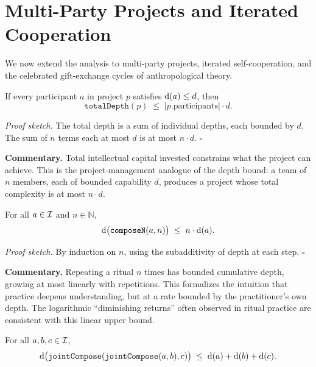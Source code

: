 \section{Multi-Party Projects and Iterated Cooperation}
\label{sec:ch16-multi}

We now extend the analysis to multi-party projects, iterated
self-cooperation, and the celebrated gift-exchange cycles of
anthropological theory.

\begin{theorem}
\label{thm:project_depth_bound}
If every participant $a$ in project $p$ satisfies $\operatorname{d}(a) \leq d$, then
\[
  \texttt{totalDepth}(p) \;\leq\; |p.\text{participants}| \cdot d.
\]
\end{theorem}

\noindent\textit{Proof sketch.}\quad
The total depth is a sum of individual depths, each bounded by $d$.
The sum of $n$ terms each at most $d$ is at most $n \cdot d$.
\hfill$\square$

\medskip

\noindent\textbf{Commentary.}
Total intellectual capital invested constrains what the project can achieve.
This is the project-management analogue of the depth bound: a team of $n$
members, each of bounded capability $d$, produces a project whose total
complexity is at most $n \cdot d$.

\begin{theorem}
\label{thm:iterated_self_cooperation_depth}
For all $a \in \mathcal{I}$ and $n \in \mathbb{N}$,
\[
  \operatorname{d}\bigl(\texttt{composeN}(a, n)\bigr) \;\leq\; n \cdot \operatorname{d}(a).
\]
\end{theorem}

\noindent\textit{Proof sketch.}\quad
By induction on $n$, using the subadditivity of depth at each step.
\hfill$\square$

\medskip

\noindent\textbf{Commentary.}
Repeating a ritual $n$ times has bounded cumulative depth, growing at most
linearly with repetitions.  This formalizes the intuition that practice
deepens understanding, but at a rate bounded by the practitioner's own
depth.  The logarithmic ``diminishing returns'' often observed in ritual
practice are consistent with this linear upper bound.

\begin{theorem}
\label{thm:gift_triangle_depth}
For all $a, b, c \in \mathcal{I}$,
\[
  \operatorname{d}\bigl(\texttt{jointCompose}(\texttt{jointCompose}(a, b), c)\bigr)
  \;\leq\; \operatorname{d}(a) + \operatorname{d}(b) + \operatorname{d}(c).
\]
\end{theorem}

